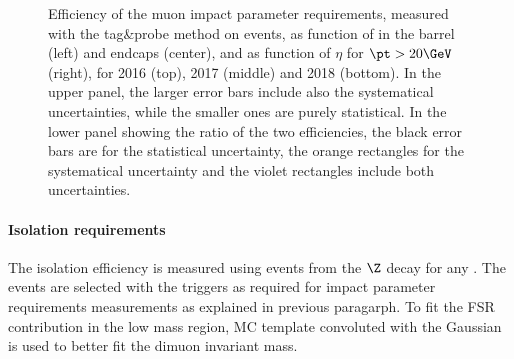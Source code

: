 \begin{figure}[htbp]
\begin{center}
    \caption{Efficiency of the muon impact parameter requirements, measured with the tag\&probe method on \Z events, as function of \pt in the barrel (left) and endcaps (center), and as function of $\eta$ for $\pt > 20\GeV$ (right), for 2016 (top), 2017 (middle) and 2018 (bottom). In the upper panel, the larger error bars include also the systematical uncertainties, while the smaller ones are purely statistical. In the lower panel showing the ratio of the two efficiencies, the black error bars are for the statistical uncertainty, the orange rectangles for the systematical uncertainty and the violet rectangles include both uncertainties.}
    \label{fig:MuonIDEff_2}
\end{center}
\end{figure}

\paragraph*{Isolation requirements}
The isolation efficiency is measured using events from the $\Z$ decay for any \pt. The events are selected with the triggers as required for impact parameter requirements measurements as explained in previous paragarph. To fit the FSR contribution in the low mass region, MC template convoluted with the Gaussian is used to better fit the dimuon invariant mass. 

